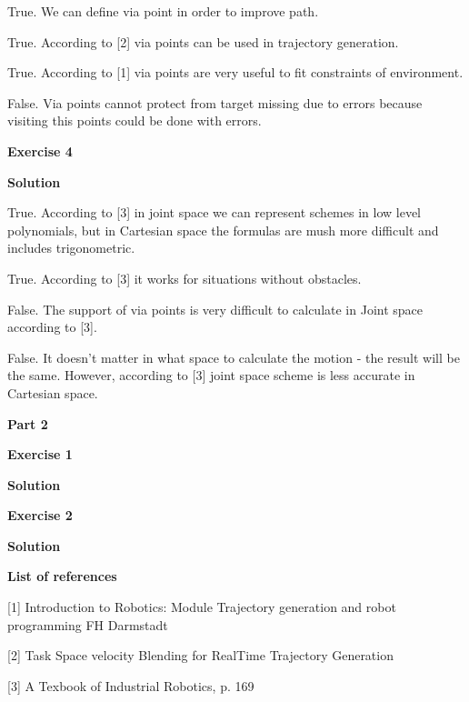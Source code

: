 \documentclass[12pt]{article}
\begin{document}
\begin{list}{()~}{}
\item True. We can define via point in order to improve path. 
\item True. According to [2] via points can be used in trajectory generation.
\item True. According to [1] via points are very useful to fit constraints of environment.
\item False. Via points cannot protect from target missing due to errors because visiting this points could be done with errors.
\end{list}

\textbf{Exercise 4}		
		
\textbf{Solution}

\medskip

\begin{list}{()~}{}
\item True. According to [3] in joint space we can represent schemes in low level polynomials, but in Cartesian space the formulas are mush more difficult and includes trigonometric.
\item True. According to [3] it works for situations without obstacles.
\item False. The support of via points is very difficult to calculate in Joint space according to [3].
\item False. It doesn't matter in what space to calculate the motion - the result will be the same. However, according to [3] joint space scheme is less accurate in Cartesian space.
\end{list}

\textbf{Part 2}	

\bigskip
	
\textbf{Exercise 1}		
		
\textbf{Solution}

\medskip

\textbf{Exercise 2}		
		
\textbf{Solution}

\medskip

\textbf{List of references}

[1] Introduction to Robotics: Module Trajectory generation and robot programming FH Darmstadt

[2] Task Space velocity Blending for RealTime Trajectory Generation

[3] A Texbook of Industrial Robotics, p. 169
\end{document}
